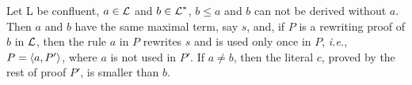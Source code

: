 %
%
\begin{lemma} \label {le:first-rule}
Let \C L be confluent, \(a\in \mbox {$\cal L$}\)
and \(b\in\mbox {$\cal L$}^\ast\), \(b\leq a\) and $b$ can not be derived
without $a$. Then $a$ and $b$ have the same maximal term, say $s$, and, if $P$
is a rewriting proof of $b$ in $\mbox {$\cal L$}$, then the rule $a$
in $P$ rewrites $s$ and is used only once in $P$,
{\em i.e.}, \(P=\langle a,P'\rangle\), where $a$ is not used in $P'$. If \(a\ne b\), then the
literal \(c\), proved by the rest of proof $P'$, is smaller than $b$.
\end{lemma}
%
%
%
%
